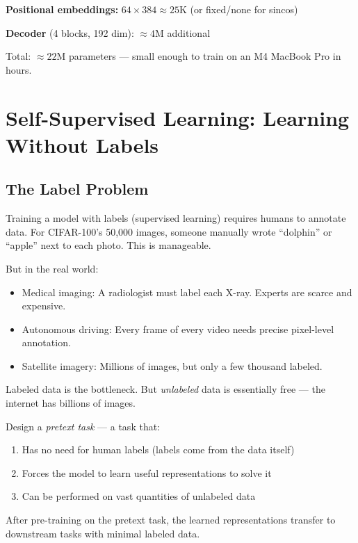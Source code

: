 \documentclass[12pt, a4paper]{report}
\begin{document}
\textbf{Positional embeddings:} $64 \times 384 \approx 25$K (or fixed/none for sincos)

\textbf{Decoder} (4 blocks, 192 dim): $\approx 4$M additional

Total: $\approx 22$M parameters — small enough to train on an M4 MacBook Pro in hours.

\chapter{Self-Supervised Learning: Learning Without Labels}

\section{The Label Problem}

Training a model with labels (supervised learning) requires humans to annotate data. For CIFAR-100's 50,000 images, someone manually wrote ``dolphin'' or ``apple'' next to each photo. This is manageable.

But in the real world:
\begin{itemize}
    \item Medical imaging: A radiologist must label each X-ray. Experts are scarce and expensive.
    \item Autonomous driving: Every frame of every video needs precise pixel-level annotation.
    \item Satellite imagery: Millions of images, but only a few thousand labeled.
\end{itemize}

Labeled data is the bottleneck. But \emph{unlabeled} data is essentially free — the internet has billions of images.

\begin{conceptbox}
Design a \emph{pretext task} — a task that:
\begin{enumerate}
    \item Has no need for human labels (labels come from the data itself)
    \item Forces the model to learn useful representations to solve it
    \item Can be performed on vast quantities of unlabeled data
\end{enumerate}

After pre-training on the pretext task, the learned representations transfer to downstream tasks with minimal labeled data.
\end{conceptbox}
\end{document}
